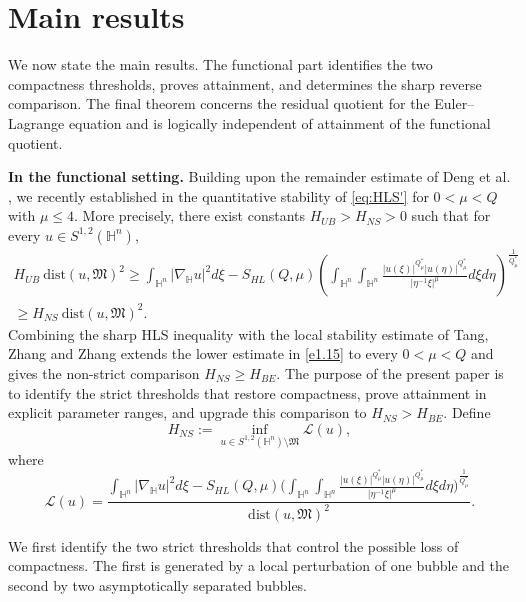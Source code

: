 \documentclass[10pt,a4paper]{amsart}
\begin{document}
\section{Main results}\label{sec main}

{We now state the main results. The functional part identifies the two compactness thresholds, proves attainment, and determines the sharp reverse comparison. The final theorem concerns the residual quotient for the Euler--Lagrange equation and is logically independent of attainment of the functional quotient.}

{\bf{In the functional setting.}}
Building upon the remainder estimate of Deng et al. \cite{DTYZ23}, we recently established in \cite[Theorem 1.1]{CW26} the quantitative stability of \eqref{eq:HLS'} for $0<\mu<Q$ with $\mu\leq4$. More precisely, there exist constants $H_{UB}>H_{NS}>0$ such that for every $u\in S^{1,2}(\mathbb{H}^{n})$,
\begin{multline}\label{e1.15}
 H_{UB}~ \mathrm{dist}(u,\mathfrak{M})^2\geq \int_{\mathbb{H}^{n}}|\nabla_{\mathbb{H}} u|^{2}{d}\xi-S_{HL}(Q,\mu) \left(\int_{\mathbb{H}^{n}}\int_{\mathbb{H}^{n}}\frac{|u(\xi)|^{Q^{\ast}_{\mu}}|u(\eta)|
^{Q^{\ast}_{\mu}}}{|\eta^{-1}\xi|^{\mu}}{d}\xi{d}\eta\right)^{\frac{1}{Q^{\ast}_{\mu}}}\\
\geq H_{NS} ~ \mathrm{dist}(u,\mathfrak{M})^2.
\end{multline}
{Combining the sharp HLS inequality with the local stability estimate of Tang, Zhang and Zhang \cite{TZZ24} extends the lower estimate in \eqref{e1.15} to every $0<\mu<Q$ and gives the non-strict comparison $H_{NS}\geq H_{BE}$. The purpose of the present paper is to identify the strict thresholds that restore compactness, prove attainment in explicit parameter ranges, and upgrade this comparison to $H_{NS}>H_{BE}$.}
Define
\begin{equation}\label{defH}
 H_{NS}:=\inf\limits_{u\in S^{1,2}(\mathbb{H}^{n})\setminus \mathfrak{M}}\mathcal{L}(u),
\end{equation}
where
\begin{equation*}
 \mathcal{L}(u)=\frac{\int_{\mathbb{H}^{n}}|\nabla_{\mathbb{H}} u|^{2}{d}\xi-S_{HL}(Q,\mu) \Big(\int_{\mathbb{H}^{n}}\int_{\mathbb{H}^{n}}\frac{|u(\xi)|^{Q^{\ast}_{\mu}}|u(\eta)|
^{Q^{\ast}_{\mu}}}{|\eta^{-1}\xi|^{\mu}}{d}\xi{d}\eta\Big)^{\frac{1}{Q^{\ast}_{\mu}}}}{\mathrm{dist}(u,\mathfrak{M})^2}.
\end{equation*}

We first identify the two strict thresholds that control the possible loss of compactness. The first is generated by a local perturbation of one bubble and the second by two asymptotically separated bubbles.
\end{document}

